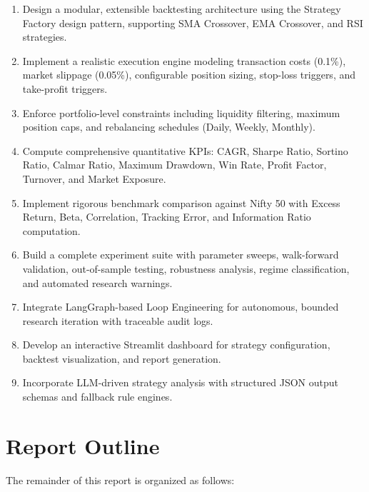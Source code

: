 \begin{enumerate}[label=\arabic*.]
    \item Design a modular, extensible backtesting architecture using the Strategy Factory design pattern, supporting SMA Crossover, EMA Crossover, and RSI strategies.
    
    \item Implement a realistic execution engine modeling transaction costs (0.1\%), market slippage (0.05\%), configurable position sizing, stop-loss triggers, and take-profit triggers.
    
    \item Enforce portfolio-level constraints including liquidity filtering, maximum position caps, and rebalancing schedules (Daily, Weekly, Monthly).
    
    \item Compute comprehensive quantitative KPIs: CAGR, Sharpe Ratio, Sortino Ratio, Calmar Ratio, Maximum Drawdown, Win Rate, Profit Factor, Turnover, and Market Exposure.
    
    \item Implement rigorous benchmark comparison against Nifty 50 with Excess Return, Beta, Correlation, Tracking Error, and Information Ratio computation.
    
    \item Build a complete experiment suite with parameter sweeps, walk-forward validation, out-of-sample testing, robustness analysis, regime classification, and automated research warnings.
    
    \item Integrate LangGraph-based Loop Engineering for autonomous, bounded research iteration with traceable audit logs.
    
    \item Develop an interactive Streamlit dashboard for strategy configuration, backtest visualization, and report generation.
    
    \item Incorporate LLM-driven strategy analysis with structured JSON output schemas and fallback rule engines.
\end{enumerate}

\section{Report Outline}

The remainder of this report is organized as follows:

